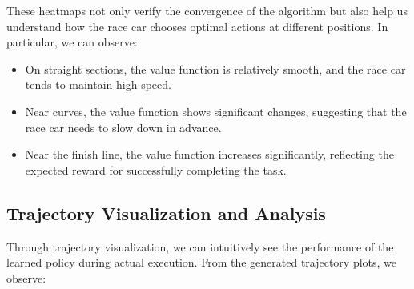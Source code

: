 \documentclass{article}
\begin{document}
These heatmaps not only verify the convergence of the algorithm but also help us understand how the race car chooses optimal actions at different positions. In particular, we can observe:
\begin{itemize}
    \item On straight sections, the value function is relatively smooth, and the race car tends to maintain high speed.
    \item Near curves, the value function shows significant changes, suggesting that the race car needs to slow down in advance.
    \item Near the finish line, the value function increases significantly, reflecting the expected reward for successfully completing the task.
\end{itemize}

\subsection{Trajectory Visualization and Analysis}
Through trajectory visualization, we can intuitively see the performance of the learned policy during actual execution. From the generated trajectory plots, we observe:
\end{document}
